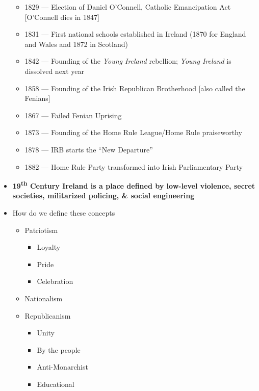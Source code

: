 \documentclass[12pt]{article}
\def\th{\textsuperscript{th}}
\begin{document}
\begin{itemize}
\begin{itemize}
                    \item 1829 --- Election of Daniel O'Connell, Catholic Emancipation Act [O'Connell dies in 1847]
                    \item 1831 --- First national schools established in Ireland (1870 for England and Wales and 1872 in Scotland)
                    \item 1842 --- Founding of the \textit{Young Ireland} rebellion; \textit{Young Ireland} is dissolved next year
                    \item 1858 --- Founding of the Irish Republican Brotherhood [also called the Fenians]
                    \item 1867 --- Failed Fenian Uprising
                    \item 1873 --- Founding of the Home Rule League/Home Rule praiseworthy
                    \item 1878 --- IRB starts the ``New Departure''
                    \item 1882 --- Home Rule Party transformed into Irish Parliamentary Party
                \end{itemize}
                \item \textbf{19\th{} Century Ireland is a place defined by low-level violence, secret societies, militarized policing, \& social engineering}
                \item How do we define these concepts
                \begin{itemize}
                    \item Patriotism
                    \begin{itemize}
                        \item Loyalty
                        \item Pride
                        \item Celebration
                    \end{itemize}
                    \item Nationalism
                    \item Republicanism
                    \begin{itemize}
                        \item Unity
                        \item By the people
                        \item Anti-Monarchist
                        \item Educational
                    \end{itemize}

\end{itemize}
\end{itemize}
\end{document}
